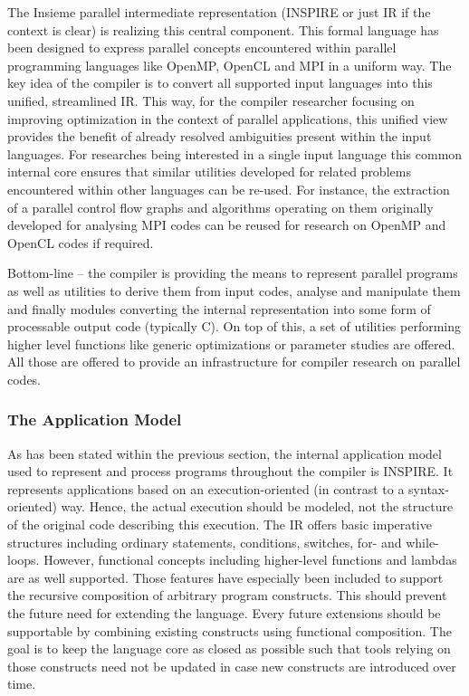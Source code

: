 The Insieme parallel intermediate representation (INSPIRE or just IR if the
context is clear) is realizing this central component. This formal language has
been designed to express parallel concepts encountered within parallel
programming languages like OpenMP, OpenCL and MPI in a uniform way. The key idea
of the compiler is to convert all supported input languages into this unified,
streamlined IR. This way, for the compiler researcher focusing on improving
optimization in the context of parallel applications, this unified view provides
the benefit of already resolved ambiguities present within the input languages.
For researches being interested in a single input language this common internal
core ensures that similar utilities developed for related problems encountered
within other languages can be re-used. For instance, the extraction of a
parallel control flow graphs and algorithms operating on them
originally developed for analysing MPI codes can be reused for research on
OpenMP and OpenCL codes if required.

Bottom-line -- the compiler is providing the means to represent parallel
programs as well as utilities to derive them from input codes, analyse and
manipulate them and finally modules converting the internal representation into
some form of processable output code (typically C). On top of this, a set of
utilities performing higher level functions like generic optimizations or
parameter studies are offered. All those are offered to provide an
infrastructure for compiler research on parallel codes.

\subsubsection{The Application Model}
As has been stated within the previous section, the internal application model
used to represent and process programs throughout the compiler is INSPIRE. It
represents applications based on an execution-oriented (in contrast to a
syntax-oriented) way. Hence, the actual execution should be modeled, not the
structure of the original code describing this execution. The IR offers basic
imperative structures including ordinary statements, conditions, switches,
for- and while-loops. However, functional concepts including higher-level
functions and lambdas are as well supported. Those features have especially been
included to support the recursive composition of arbitrary program constructs.
This should prevent the future need for extending the language. Every future
extensions should be supportable by combining existing constructs using
functional composition. The goal is to keep the language core as closed as
possible such that tools relying on those constructs need not be updated in case
new constructs are introduced over time.

